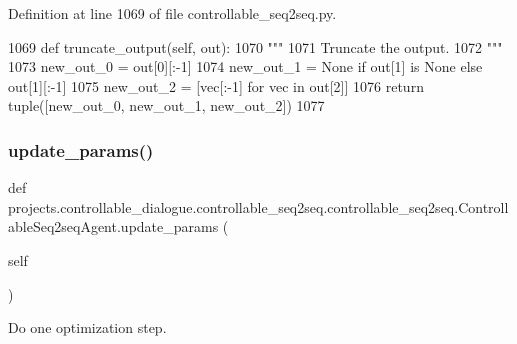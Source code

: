 Definition at line 1069 of file controllable\+\_\+seq2seq.\+py.


\begin{DoxyCode}
1069     \textcolor{keyword}{def }truncate\_output(self, out):
1070         \textcolor{stringliteral}{"""}
1071 \textcolor{stringliteral}{        Truncate the output.}
1072 \textcolor{stringliteral}{        """}
1073         new\_out\_0 = out[0][:-1]
1074         new\_out\_1 = \textcolor{keywordtype}{None} \textcolor{keywordflow}{if} out[1] \textcolor{keywordflow}{is} \textcolor{keywordtype}{None} \textcolor{keywordflow}{else} out[1][:-1]
1075         new\_out\_2 = [vec[:-1] \textcolor{keywordflow}{for} vec \textcolor{keywordflow}{in} out[2]]
1076         \textcolor{keywordflow}{return} tuple([new\_out\_0, new\_out\_1, new\_out\_2])
1077 
\end{DoxyCode}
\mbox{\label{classprojects_1_1controllable__dialogue_1_1controllable__seq2seq_1_1controllable__seq2seq_1_1ControllableSeq2seqAgent_a9d5a1ac61fa3ebf363a8b15106a7e08b}} 
\subsubsection{\texorpdfstring{update\+\_\+params()}{update\_params()}}
{\footnotesize\ttfamily def projects.\+controllable\+\_\+dialogue.\+controllable\+\_\+seq2seq.\+controllable\+\_\+seq2seq.\+Controllable\+Seq2seq\+Agent.\+update\+\_\+params (\begin{DoxyParamCaption}\item[{}]{self }\end{DoxyParamCaption})}

\begin{DoxyVerb}Do one optimization step.
\end{DoxyVerb}
 

